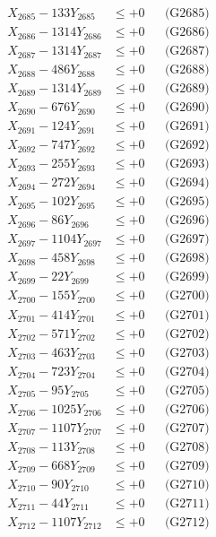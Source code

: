 \documentclass[a4paper,10pt]{article}
\begin{document}
{\begin{align}
X_{2685} - 133Y_{2685} &\leq +0 && \text{(G2685)} \\
X_{2686} - 1314Y_{2686} &\leq +0 && \text{(G2686)} \\
X_{2687} - 1314Y_{2687} &\leq +0 && \text{(G2687)} \\
X_{2688} - 486Y_{2688} &\leq +0 && \text{(G2688)} \\
X_{2689} - 1314Y_{2689} &\leq +0 && \text{(G2689)} \\
X_{2690} - 676Y_{2690} &\leq +0 && \text{(G2690)} \\
\allowbreak
X_{2691} - 124Y_{2691} &\leq +0 && \text{(G2691)} \\
X_{2692} - 747Y_{2692} &\leq +0 && \text{(G2692)} \\
X_{2693} - 255Y_{2693} &\leq +0 && \text{(G2693)} \\
X_{2694} - 272Y_{2694} &\leq +0 && \text{(G2694)} \\
X_{2695} - 102Y_{2695} &\leq +0 && \text{(G2695)} \\
X_{2696} - 86Y_{2696} &\leq +0 && \text{(G2696)} \\
X_{2697} - 1104Y_{2697} &\leq +0 && \text{(G2697)} \\
X_{2698} - 458Y_{2698} &\leq +0 && \text{(G2698)} \\
X_{2699} - 22Y_{2699} &\leq +0 && \text{(G2699)} \\
X_{2700} - 155Y_{2700} &\leq +0 && \text{(G2700)} \\
\allowbreak
X_{2701} - 414Y_{2701} &\leq +0 && \text{(G2701)} \\
X_{2702} - 571Y_{2702} &\leq +0 && \text{(G2702)} \\
X_{2703} - 463Y_{2703} &\leq +0 && \text{(G2703)} \\
X_{2704} - 723Y_{2704} &\leq +0 && \text{(G2704)} \\
X_{2705} - 95Y_{2705} &\leq +0 && \text{(G2705)} \\
X_{2706} - 1025Y_{2706} &\leq +0 && \text{(G2706)} \\
X_{2707} - 1107Y_{2707} &\leq +0 && \text{(G2707)} \\
X_{2708} - 113Y_{2708} &\leq +0 && \text{(G2708)} \\
X_{2709} - 668Y_{2709} &\leq +0 && \text{(G2709)} \\
X_{2710} - 90Y_{2710} &\leq +0 && \text{(G2710)} \\
\allowbreak
X_{2711} - 44Y_{2711} &\leq +0 && \text{(G2711)} \\
X_{2712} - 1107Y_{2712} &\leq +0 && \text{(G2712)} \\

\end{align}}
\end{document}
